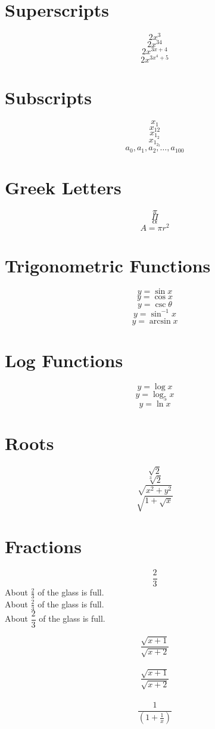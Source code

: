 \documentclass[11pt]{article}
\begin{document}
\section{Superscripts} 

$$2x^3$$
$$2x^{34}$$
$$2x^{3x+4}$$
$$2x^{3x^4+5}$$

\section{Subscripts}
$$x_1$$
$$x_{12}$$
$$x_{1_2}$$
$$x_{1_{2_3}}$$
$$a_0, a_1, a_2, \ldots, a_{100}$$

\section{Greek Letters}
$$\pi$$
$$\Pi$$
$$\alpha$$
$$A=\pi r^2$$

\section{Trigonometric Functions}
$$y=\sin x$$
$$y=\cos x$$
$$y=\csc \theta$$
$$y=\sin^{-1} x$$
$$y=\arcsin x$$

\section{Log Functions}
$$y=\log x$$
$$y=\log_5 x$$
$$y=\ln x$$

\section{Roots}
$$\sqrt{2}$$
$$\sqrt[3]{2}$$
$$\sqrt{x^2+y^2}$$
$$\sqrt{1+\sqrt{x}}$$

\section{Fractions}
$$\frac{2}{3}$$
About $\displaystyle \frac{2}{3}$ of the glass is full.\\[16pt]
About $\frac{2}{3}$ of the glass is full.\\[6pt]
About $\dfrac{2}{3}$ of the glass is full.

$$\frac{\sqrt{x+1}}{\sqrt{x+2}}$$ \\
$$\frac{\sqrt{x+1}}{\sqrt{x+2}}$$ \\
$$\frac{1}{(1+\frac{1}{x})}$$
\end{document}
